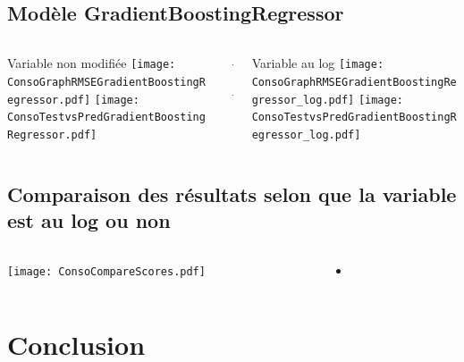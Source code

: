 \documentclass[8pt,aspectratio=169,hyperref={unicode=true}]{beamer}
\begin{document}
\subsection{Modèle GradientBoostingRegressor}
\begin{frame}{\insertsubsection}
  \begin{columns}[t]
    \begin{column}{.33\textwidth}
      \centering Variable non modifiée
      \texttt{[image: ConsoGraphRMSEGradientBoostingRegressor.pdf]}
      \texttt{[image: ConsoTestvsPredGradientBoostingRegressor.pdf]}
    \end{column}
    \begin{column}{.33\textwidth}
      $\Longleftarrow$
      \scriptsize
      {\centering
        }
      

      \normalsize
      $\Longleftarrow$

      \raggedleft{$\Longrightarrow$}
      \scriptsize
      {\centering
        }
      

      \normalsize
      \raggedleft{$\Longrightarrow$}
    \end{column}
    \begin{column}{.33\textwidth}
      \centering Variable au log
      \texttt{[image: ConsoGraphRMSEGradientBoostingRegressor\_log.pdf]}
      \texttt{[image: ConsoTestvsPredGradientBoostingRegressor\_log.pdf]}
    \end{column}
  \end{columns}
\end{frame}

\subsection{Comparaison des résultats selon que la variable est au log ou non}
\begin{frame}{\insertsubsection}
  \begin{columns}
    \begin{column}{.5\textwidth}
      \centering
      \texttt{[image: ConsoCompareScores.pdf]}
    \end{column}
    \begin{column}{.5\textwidth}
      \begin{itemize}
        \item
      \end{itemize}
    \end{column}
  \end{columns}
\end{frame}

\section{Conclusion}
\begin{frame}{\insertsection}

\end{frame}
\end{document}
